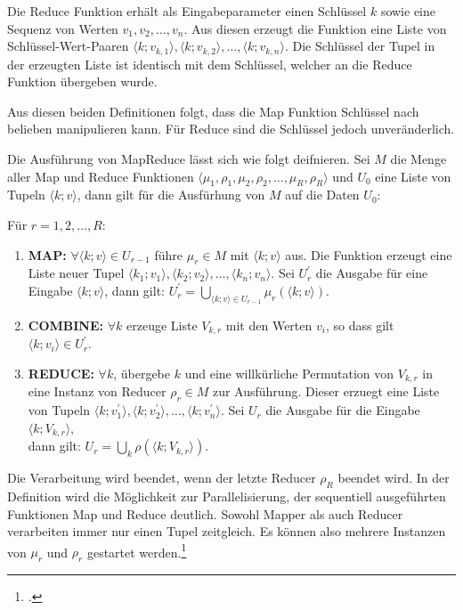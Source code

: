 Die Reduce Funktion erhält als Eingabeparameter einen Schlüssel $k$ sowie eine Sequenz von Werten $v_1, v_2, \dots, v_n$. Aus diesen erzeugt die Funktion eine Liste von Schlüssel-Wert-Paaren $\langle k; v_{k,1} \rangle, \langle k; v_{k,2} \rangle, \dots, \langle k; v_{k,n} \rangle$. Die Schlüssel der Tupel in der erzeugten Liste ist identisch mit dem Schlüssel, welcher an die Reduce Funktion übergeben wurde.

Aus diesen beiden Definitionen folgt, dass die Map Funktion Schlüssel nach belieben manipulieren kann. Für Reduce sind die Schlüssel jedoch unveränderlich.

Die Ausführung von MapReduce lässt sich wie folgt deifnieren. Sei $M$ die Menge aller Map und Reduce Funktionen $\langle \mu_1, \rho_1, \mu_2, \rho_2, \dots, \mu_R, \rho_R \rangle$ und $U_0$ eine Liste von Tupeln $\langle k; v \rangle$, dann gilt für die Ausfürhung von $M$ auf die Daten $U_0$:

Für $r = 1, 2, \dots, R$:

\begin{enumerate}
	\item \textbf{MAP:} $\forall \langle k; v \rangle \in U_{r-1}$ führe $\mu_r \in M$ mit $\langle k; v \rangle$ aus. Die Funktion erzeugt eine Liste neuer Tupel $\langle k_1; v_1 \rangle, \langle k_2; v_2 \rangle, \dots, \langle k_n; v_n \rangle$. Sei $U_r^{\prime}$ die Ausgabe für eine Eingabe $\langle k; v \rangle$, dann gilt: $U_r^{\prime} = \bigcup_{\langle k; v \rangle \in U_{r-1}} \mu_r(\langle k; v\rangle)$.
	\item \textbf{COMBINE:} $\forall k$ erzeuge Liste $V_{k,r}$ mit den Werten $v_i$, so dass gilt $\langle k; v_i \rangle \in U_r^{\prime}$.
	\item \textbf{REDUCE:} $\forall k$, übergebe $k$ und eine willkürliche Permutation von $V_{k,r}$ in eine Instanz von Reducer $\rho_r \in M$ zur Ausführung. Dieser erzuegt eine Liste von Tupeln $\langle k; v_1^{\prime} \rangle, \langle k; v_2^{\prime} \rangle, \dots, \langle k; v_n^{\prime} \rangle$. Sei $U_r$ die Ausgabe für die Eingabe $\langle k; V_{k,r} \rangle$, \\ dann gilt: $U_r = \bigcup_k \rho(\langle k; V_{k,r}\rangle)$.
\end{enumerate}

Die Verarbeitung wird beendet, wenn der letzte Reducer $\rho_R$ beendet wird. In der Definition wird die Möglichkeit zur Parallelisierung, der sequentiell ausgeführten Funktionen Map und Reduce deutlich. Sowohl Mapper als auch Reducer verarbeiten immer nur einen Tupel zeitgleich. Es können also mehrere Instanzen von $\mu_r$ und $\rho_r$ gestartet werden.\footcite[Vgl.][S. 2 f]{Karloff.2010}

